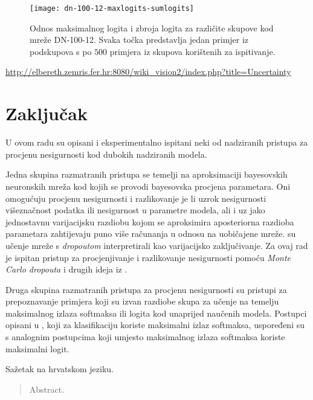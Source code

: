\documentclass[utf8, diplomski, lmodern]{fer}
\begin{document}
\begin{figure}
	\centering
	\texttt{[image: dn-100-12-maxlogits-sumlogits]}
	\caption{Odnos maksimalnog logita i zbroja logita za različite skupove kod mreže DN-100-12. Svaka točka predstavlja jedan primjer iz podskupova s po $500$ primjera iz skupova korištenih za ispitivanje.}
	\label{fig:dn-100-12-maxlogits-sumlogits}
\end{figure}


\url{http://elbereth.zemris.fer.hr:8080/wiki_vision2/index.php?title=Uncertainty}



\chapter{Zaključak}

U ovom radu su opisani i eksperimentalno ispitani neki od nadziranih pristupa za procjenu nesigurnosti kod dubokih nadziranih modela. 

Jedna skupina razmatranih pristupa se temelji na aproksimaciji bayesovskih neuronskih mreža kod kojih se provodi bayesovska procjena parametara. Oni omogućuju procjenu nesigurnosti i razlikovanje je li uzrok nesigurnosti višeznačnost podatka ili nesigurnost u parametre modela, ali i uz jako jednostavnu varijacijsku razdiobu kojom se aproksimira aposteriorna razdioba parametara zahtijevaju puno više računanja u odnosu na uobičajene mreže. \citet{Gal:2016:BCNNBAVI} su učenje mreže s \textit{dropoutom} interpretirali kao varijacijsko zaključivanje. Za ovaj rad je ispitan pristup za procjenjivanje i razlikovanje nesigurnosti pomoću \textit{Monte Carlo dropouta} i drugih ideja iz \citet{Kendall:2017:WUNBDLCV,Smith:2018:UMUAED}.

Druga skupina razmatranih pristupa za procjenu nesigurnosti su pristupi za prepoznavanje primjera koji su izvan razdiobe skupa za učenje \citet{Guo:2017:CMNN,Hendrycks:2016:BDMOODE,Liang:2017:PDOODENN} na temelju maksimalnog izlaza softmaksa ili logita kod unaprijed naučenih modela. Postupci opisani u \citet{Hendrycks:2016:BDMOODE,Liang:2017:PDOODENN}, koji za klasifikaciju koriste maksimalni izlaz softmaksa, uspoređeni su s analognim postupcima koji umjesto maksimalnog izlaza softmaksa koriste maksimalni logit.



 

\begin{sazetak}
Sažetak na hrvatskom jeziku.

\end{sazetak}

\begin{abstract}
Abstract.

\end{abstract}
\end{document}
